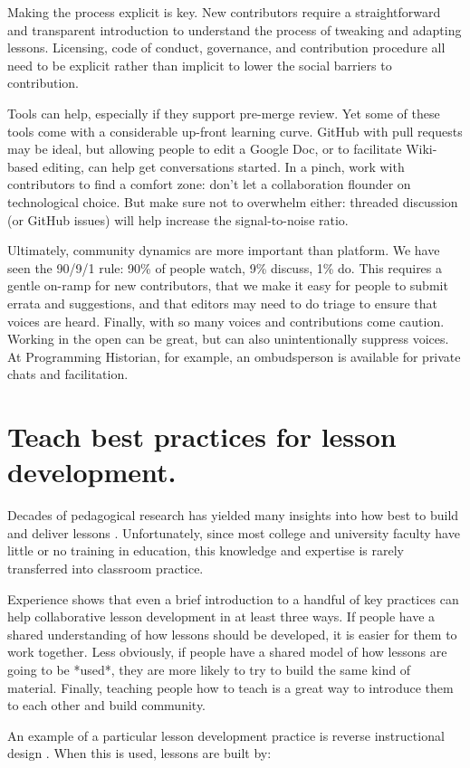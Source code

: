 \documentclass[10pt,letterpaper]{article}
\newcommand{\rulemajor}[1]{\section{#1}}
\begin{document}
Making the process explicit is key.
New contributors require a straightforward and transparent introduction
to understand the process of tweaking and adapting lessons.
Licensing, code of conduct, governance, and contribution procedure
all need to be explicit rather than implicit
to lower the social barriers to contribution.

Tools can help,
especially if they support pre-merge review.
Yet some of these tools come with a considerable up-front learning curve.
GitHub with pull requests may be ideal,
but allowing people to edit a Google Doc,
or to facilitate Wiki-based editing,
can help get conversations started.
In a pinch,
work with contributors to find a comfort zone:
don't let a collaboration flounder on technological choice.
But make sure not to overwhelm either:
threaded discussion (or GitHub issues) will help increase the signal-to-noise ratio.

Ultimately,
community dynamics are more important than platform.
We have seen the 90/9/1 rule:
90\% of people watch, 9\% discuss, 1\% do.
This requires a gentle on-ramp for new contributors,
that we make it easy for people to submit errata and suggestions,
and that editors may need to do triage to ensure that voices are heard.
Finally, with so many voices and contributions come caution.
Working in the open can be great,
but can also unintentionally suppress voices.
At Programming Historian,
for example,
an ombudsperson is available for private chats and facilitation.

\rulemajor{Teach best practices for lesson development.}

Decades of pedagogical research has yielded many insights into
how best to build and deliver lessons \cite{hlw}.
Unfortunately,
since most college and university faculty have little or no training in education,
this knowledge and expertise is rarely transferred into classroom practice.

Experience shows that even a brief introduction to a handful of key practices
can help collaborative lesson development in at least three ways.
If people have a shared understanding of how lessons should be developed,
it is easier for them to work together.
Less obviously,
if people have a shared model of how lessons are going to be *used*,
they are more likely to try to build the same kind of material.
Finally,
teaching people how to teach is a great way to introduce them to each other and build community.

An example of a particular lesson development practice is reverse instructional design
\cite{wiggins-mctighe}.
When this is used,
lessons are built by:
\end{document}
